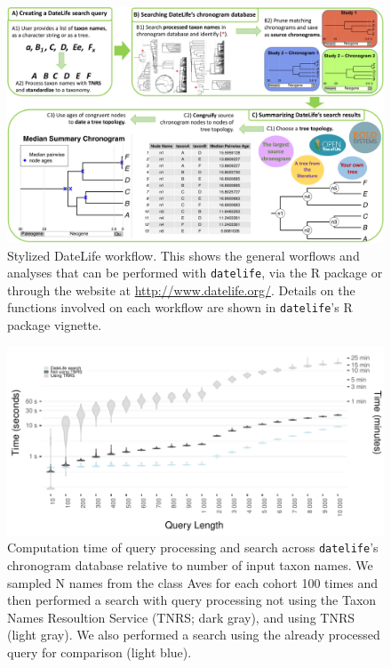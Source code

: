 \documentclass[
  english,
  man]{apa6}
\begin{document}
\begin{figure}[!h]
\includegraphics{../figures/figure1/figure1-new.pdf}
\caption{Stylized DateLife workflow. This shows the general worflows and analyses that can be performed with \texttt{datelife}, via the R package or through the website  at \url{http://www.datelife.org/}. Details on the functions involved on each workflow are shown in \texttt{datelife}'s R package vignette.
}
\label{fig:workflow}
\end{figure}


\begin{figure}[!h]
\includegraphics[width=1\linewidth]{../figures/fig_runtime_main.pdf}
\caption{Computation time of query processing and search across \texttt{datelife}'s chronogram database relative to number of input taxon names. We sampled N names from the class Aves for each cohort 100 times and then performed a search with query processing not using the Taxon Names Resoultion Service (TNRS; dark gray), and using TNRS (light gray). We also performed a search using the already processed query for comparison (light blue).}
\label{fig:runtime_main}
\end{figure}
\end{document}
